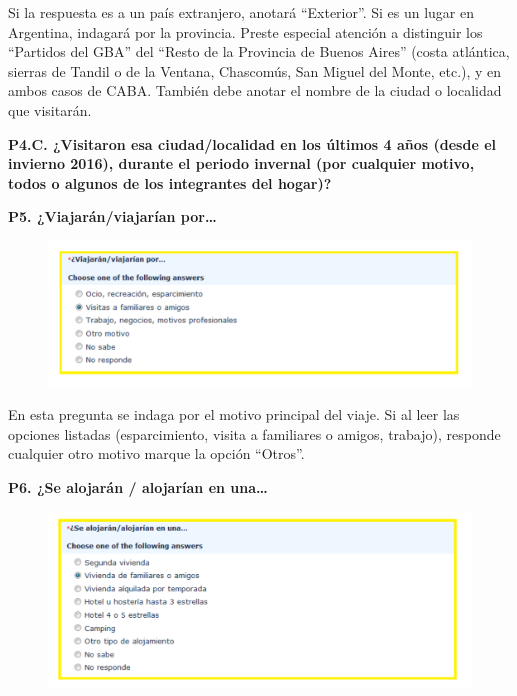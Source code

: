 \documentclass[
  openany]{book}
\begin{document}
Si la respuesta es a un país extranjero, anotará ``Exterior''. Si es un lugar en Argentina, indagará por la provincia. Preste especial atención a distinguir los ``Partidos del GBA'' del ``Resto de la Provincia de Buenos Aires'' (costa atlántica, sierras de Tandil o de la Ventana, Chascomús, San Miguel del Monte, etc.), y en ambos casos de CABA. También debe anotar el nombre de la ciudad o localidad que visitarán.

\textbf{P4.C. ¿Visitaron esa ciudad/localidad en los últimos 4 años (desde el invierno 2016), durante el periodo invernal (por cualquier motivo, todos o algunos de los integrantes del hogar)?}

\textbf{P5. ¿Viajarán/viajarían por\ldots{}}

\begin{figure}

{\centering \includegraphics[width=1\linewidth]{imagenes/figura6-132} 

}

\end{figure}

En esta pregunta se indaga por el motivo principal del viaje. Si al leer las opciones listadas (esparcimiento, visita a familiares o amigos, trabajo), responde cualquier otro motivo marque la opción ``Otros''.

\textbf{P6. ¿Se alojarán / alojarían en una\ldots{}}

\begin{figure}

{\centering \includegraphics[width=1\linewidth]{imagenes/figura6-133} 

}

\end{figure}
\end{document}
